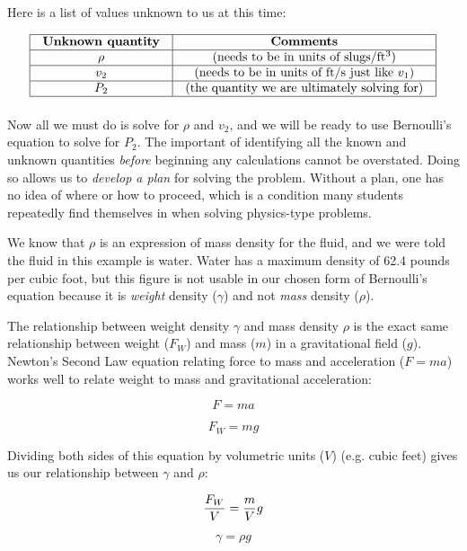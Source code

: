 \vskip 10pt

Here is a list of values unknown to us at this time:


$$\vbox{\offinterlineskip
\halign{\strut
\vrule \quad\hfil # \ \hfil & 
\vrule \quad\hfil # \ \hfil \vrule \cr
\noalign{\hrule}
%
\textbf{Unknown quantity} & \textbf{Comments} \cr
%
\noalign{\hrule}
%
$\rho$ & (needs to be in units of slugs/ft$^{3}$) \cr
%
\noalign{\hrule}
%
$v_2$ & (needs to be in units of ft/s just like $v_1$) \cr
%
\noalign{\hrule}
%
$P_2$ & (the quantity we are ultimately solving for) \cr
%
\noalign{\hrule}
} %
}$$ %

Now all we must do is solve for $\rho$ and $v_2$, and we will be ready to use Bernoulli's equation to solve for $P_2$.  The important of identifying all the known and unknown quantities \textit{before} beginning any calculations cannot be overstated.  Doing so allows us to \textit{develop a plan} for solving the problem.  Without a plan, one has no idea of where or how to proceed, which is a condition many students repeatedly find themselves in when solving physics-type problems.

We know that $\rho$ is an expression of mass density for the fluid, and we were told the fluid in this example is water.  Water has a maximum density of 62.4 pounds per cubic foot, but this figure is not usable in our chosen form of Bernoulli's equation because it is \textit{weight} density ($\gamma$) and not \textit{mass} density ($\rho$).

The relationship between weight density $\gamma$ and mass density $\rho$ is the exact same relationship between weight ($F_W$) and mass ($m$) in a gravitational field ($g$).  Newton's Second Law equation relating force to mass and acceleration ($F = ma$) works well to relate weight to mass and gravitational acceleration:

$$F = ma$$

$$F_W = mg$$

Dividing both sides of this equation by volumetric units ($V$) (e.g. cubic feet) gives us our relationship between $\gamma$ and $\rho$:

$${F_W \over V} = {m \over V} g$$

$$\gamma = \rho g$$

\filbreak

